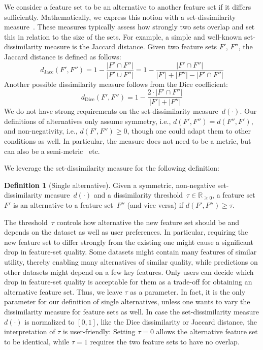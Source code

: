 \documentclass{article}
\theoremstyle{definition}
\newtheorem{definition}[proposition]{Definition} %
\begin{document}
We consider a feature set to be an alternative to another feature set if it differs sufficiently.
Mathematically, we express this notion with a set-dissimilarity measure~\cite{choi2010survey, egghe2009new}.
These measures typically assess how strongly two sets overlap and set this in relation to the size of the sets.
For example, a simple and well-known set-dissimilarity measure is the Jaccard distance.
Given two feature sets $F'$, $F''$, the Jaccard distance is defined as follows:
%
\begin{equation}
	d_{\text{Jacc}}(F',F'') = 1 - \frac{|F' \cap F''|}{|F' \cup F''|} = 1 - \frac{|F' \cap F''|}{|F'| + |F''| - |F' \cap F''|}
	\label{eq:afs:jaccard}
\end{equation}
%
Another possible dissimilarity measure follows from the Dice coefficient:
%
\begin{equation}
	d_{\text{Dice}}(F',F'') = 1 - \frac{2 \cdot |F' \cap F''|}{|F'| + |F''|}
	\label{eq:afs:dice}
\end{equation}
%
We do not have strong requirements on the set-dissimilarity measure~$d(\cdot)$.
Our definitions of alternatives only assume symmetry, i.e., $d(F',F'')=d(F'',F')$, and non-negativity, i.e., $d(F',F'') \geq 0$, though one could adapt them to other conditions as well.
In particular, the measure does not need to be a metric, but can also be a semi-metric~\cite{wilson1931semi} etc.

We leverage the set-dissimilarity measure for the following definition:
%
\begin{definition}[Single alternative]
	Given a symmetric, non-negative set-dissimilarity measure~$d(\cdot)$ and a dissimilarity threshold~$\tau \in \mathbb{R}_{\geq 0}$, a feature set $F'$ is an alternative to a feature set~$F''$ (and vice versa) if $d(F',F'') \geq \tau$.
	\label{def:afs:single-alternative}
\end{definition}
%
The threshold~$\tau$ controls how alternative the new feature set should be and depends on the dataset as well as user preferences.
In particular, requiring the new feature set to differ strongly from the existing one might cause a significant drop in feature-set quality.
Some datasets might contain many features of similar utility, thereby enabling many alternatives of similar quality, while predictions on other datasets might depend on a few key features.
Only users can decide which drop in feature-set quality is acceptable for them as a trade-off for obtaining an alternative feature set.
Thus, we leave $\tau$ as a parameter.
In fact, it is the only parameter for our definition of single alternatives, unless one wants to vary the dissimilarity measure for feature sets as well.
In case the set-dissimilarity measure $d(\cdot)$ is normalized to $[0,1]$, like the Dice dissimilarity or Jaccard distance, the interpretation of $\tau$ is user-friendly:
Setting $\tau=0$ allows the alternative feature set to be identical, while $\tau=1$ requires the two feature sets to have no overlap.
\end{document}
